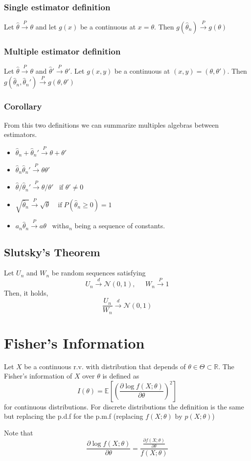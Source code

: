 \subsubsection{Single estimator definition}
Let $\hat{\theta}\xrightarrow{P}\theta$ and let $g(x)$ be a continuous at
$x=\theta$. Then $g(\hat{\theta}_n) \xrightarrow{P}g(\theta)$
\subsubsection{Multiple estimator definition}
Let $\hat{\theta}\xrightarrow{P}\theta$ and
$\hat{\theta}'\xrightarrow{P}\theta'$. Let $g(x,y)$ be a continuous at
$(x,y)=(\theta,\theta')$. Then $g(\hat{\theta}_n,\hat{\theta}_n')
\xrightarrow{P}g(\theta,\theta')$

\subsubsection{Corollary}
From this two definitions we can summarize multiples algebras between
estimators.
\begin{itemize}
    \item $\hat{\theta}_n + \hat{\theta}_n' \xrightarrow{P} \theta + \theta'$
    \item $\hat{\theta}_n\hat{\theta}_n' \xrightarrow{P} \theta\theta'$
    \item $\hat{\theta} / \hat{\theta}_n' \xrightarrow{P} \theta/ \theta' \;\;\;
    \text{if } \theta' \neq 0$
    \item $\sqrt{\hat{\theta}_n} \xrightarrow{P} \sqrt{\theta} \;\;\;\;
    \text{if}\; P(\hat{\theta}_n \geq 0) = 1$
    \item $a_n\hat{\theta}_n \xrightarrow{P} a\theta \;\;\; \text{with} a_n$
    being a sequence of constants. 
\end{itemize}

\subsection{Slutsky's Theorem}
Let $U_n$ and $W_n$ be random sequences satisfying
\[ U_n\xrightarrow{d}\mathcal{N}(0,1),\;\;\;\;\; W_n\xrightarrow{P}1\] Then, it
holds,
\[\frac{U_n}{W_n} \xrightarrow{d} \mathcal{N}(0,1)\]

\section{Fisher's Information}
Let $X$ be a continuous r.v. with distribution that depends of $\theta \in
\Theta \subset \mathbb{R}$. The Fisher's information of $X$ over $\theta$ is
defined as
\[ I(\theta) = \mathbb{E}\left[\left(\frac{\partial\log
f(X;\theta)}{\partial\theta}\right)^2\right] \] for continuous distributions.
For discrete distributions the definition is the same but replacing the p.d.f
for the p.m.f (replacing $f(X;\theta) \text{ by } p(X;\theta)$)
\begin{tcolorbox}
    Note that
    \[ \frac{\partial\log f(X;\theta)}{\partial\theta} = \frac{\frac{\partial
    f(X;\theta)}{\partial\theta}}{f(X;\theta)} \]
\end{tcolorbox}

